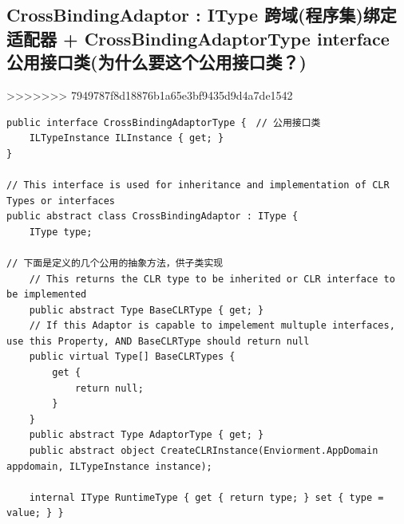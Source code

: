 \documentclass[9pt, b5paper]{article}
\begin{document}
\subsection{CrossBindingAdaptor : IType 跨域(程序集)绑定适配器 + CrossBindingAdaptorType interface 公用接口类(为什么要这个公用接口类？)}
\label{sec-11-1}
>>>>>>> 7949787f8d18876b1a65e3bf9435d9d4a7de1542
\begin{verbatim}
public interface CrossBindingAdaptorType {　// 公用接口类
    ILTypeInstance ILInstance { get; }
}

// This interface is used for inheritance and implementation of CLR Types or interfaces
public abstract class CrossBindingAdaptor : IType {
    IType type;

// 下面是定义的几个公用的抽象方法，供子类实现    
    // This returns the CLR type to be inherited or CLR interface to be implemented
    public abstract Type BaseCLRType { get; }
    // If this Adaptor is capable to impelement multuple interfaces, use this Property, AND BaseCLRType should return null
    public virtual Type[] BaseCLRTypes {
        get {
            return null;
        }
    }
    public abstract Type AdaptorType { get; }
    public abstract object CreateCLRInstance(Enviorment.AppDomain appdomain, ILTypeInstance instance);

    internal IType RuntimeType { get { return type; } set { type = value; } }


\end{verbatim}
\end{document}

